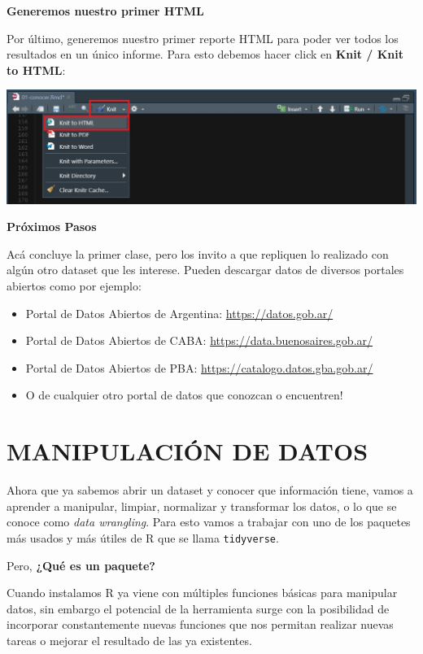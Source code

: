 \documentclass[
  spanish,
]{book}
\begin{document}
\textbf{Generemos nuestro primer HTML}

Por último, generemos nuestro primer reporte HTML para poder ver todos los resultados en un único informe. Para esto debemos hacer click en \textbf{Knit / Knit to HTML}:

\includegraphics{images/004.jpg}

\textbf{Próximos Pasos}

Acá concluye la primer clase, pero los invito a que repliquen lo realizado con algún otro dataset que les interese. Pueden descargar datos de diversos portales abiertos como por ejemplo:

\begin{itemize}
\item
  Portal de Datos Abiertos de Argentina: \url{https://datos.gob.ar/}
\item
  Portal de Datos Abiertos de CABA: \url{https://data.buenosaires.gob.ar/}
\item
  Portal de Datos Abiertos de PBA: \url{https://catalogo.datos.gba.gob.ar/}
\item
  O de cualquier otro portal de datos que conozcan o encuentren!
\end{itemize}

\hypertarget{manipulaciuxf3n-de-datos}{%
\chapter{MANIPULACIÓN DE DATOS}\label{manipulaciuxf3n-de-datos}}

Ahora que ya sabemos abrir un dataset y conocer que información tiene, vamos a aprender a manipular, limpiar, normalizar y transformar los datos, o lo que se conoce como \emph{data wrangling}. Para esto vamos a trabajar con uno de los paquetes más usados y más útiles de R que se llama \texttt{tidyverse}.

Pero, \textbf{¿Qué es un paquete?}

Cuando instalamos R ya viene con múltiples funciones básicas para manipular datos, sin embargo el potencial de la herramienta surge con la posibilidad de incorporar constantemente nuevas funciones que nos permitan realizar nuevas tareas o mejorar el resultado de las ya existentes.
\end{document}
